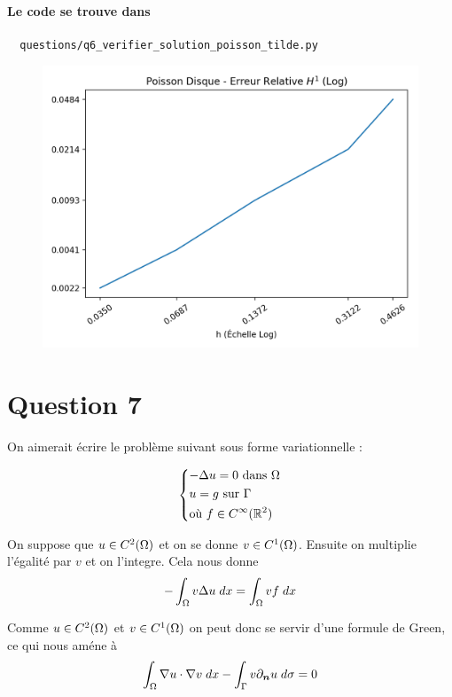 \documentclass[french, 12pt, a4paper]{article}
\begin{document}
\paragraph{Le code se trouve dans}
\begin{verbatim}
  questions/q6_verifier_solution_poisson_tilde.py
\end{verbatim}

\begin{figure}[H]
\centering
\includegraphics[scale=0.6]{figure_6.png}
\end{figure}


\section*{Question 7}

On aimerait écrire le problème suivant sous forme variationnelle :

\[
\begin{dcases}
-\Delta u = 0 \text{ dans } \Omega \\
u = g \text{ sur } \Gamma \\
\text{où } f \in C^\infty(\mathbb{R}^2)
\end{dcases}
\]

On suppose que $u \in C^2(\Omega)$ et on se donne $v \in C^1(\Omega)$.
Ensuite on multiplie l'égalité par $v$ et on l'integre. Cela nous donne
\[
-\int_\Omega v \Delta u \; dx = \int_\Omega vf \; dx
\]

Comme $u \in C^2(\Omega)$ et $v \in C^1(\Omega)$ on peut donc se
servir d'une formule de Green, ce qui nous améne à
\[
\int_\Omega \nabla u \cdot \nabla v \; dx
- \int_\Gamma v \partial_{\bm n}{u} \; d\sigma = 0
\]
\end{document}
